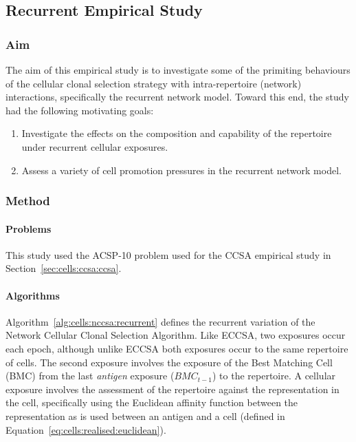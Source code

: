 %
%
\subsection{Recurrent Empirical Study}
\label{sec:cells:network:recurrent:study}
%
%
\subsubsection{Aim}
The aim of this empirical study is to investigate some of the primiting behaviours of the cellular clonal selection strategy with intra-repertoire (network) interactions, specifically the recurrent network model. Toward this end, the study had the following motivating goals:

\begin{enumerate}	
	\item Investigate the effects on the composition and capability of the repertoire under recurrent cellular exposures.
	\item Assess a variety of cell promotion pressures in the recurrent network model.
\end{enumerate}

%
%
\subsubsection{Method}

%
%
\paragraph{Problems}
This study used the ACSP-10 problem used for the CCSA empirical study in Section~\ref{sec:cells:ccsa:ccsa}.

%
%
\paragraph{Algorithms}
Algorithm~\ref{alg:cells:nccsa:recurrent} defines the recurrent variation of the Network Cellular Clonal Selection Algorithm. Like ECCSA, two exposures occur each epoch, although unlike ECCSA both exposures occur to the same repertoire of cells. The second exposure involves the exposure of the Best Matching Cell (BMC) from the last \emph{antigen} exposure ($BMC_{t-1}$) to the repertoire. A cellular exposure involves the assessment of the repertoire against the representation in the cell, specifically using the Euclidean affinity function between the representation as is used between an antigen and a cell (defined in Equation~\ref{eq:cells:realised:euclidean}).

